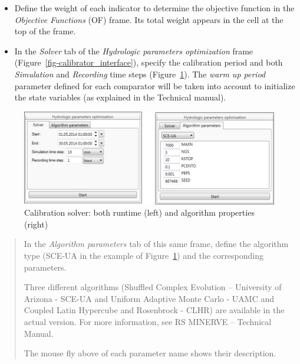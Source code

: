 \documentclass[
  letterpaper,
  DIV=11,
  numbers=noendperiod]{scrreprt}
\begin{document}
\begin{itemize}
\item
  {Define the weight of each indicator to determine the objective
  function in the \emph{Objective Functions} (OF) frame.} Its total
  weight appears in the cell at the top of the frame.
\item
  {In the \emph{Solver} tab of the \emph{Hydrologic parameters
  optimization} frame (Figure~\ref{fig-calibrator_interface}), specify
  the calibration period and both \emph{Simulation} and \emph{Recording}
  time steps (Figure~\ref{fig-calibrator_solver_runtime_algorithms}).
  The \emph{warm up period} parameter defined for each comparator will
  be taken into account to initialize the state variables (as explained
  in the Technical manual).}
\end{itemize}

\begin{figure}

{\centering \includegraphics{./figures/fig-calibrator_solver_runtime_algorithms.png}

}

\caption{\label{fig-calibrator_solver_runtime_algorithms}Calibration
solver: both runtime (left) and algorithm properties (right)}

\end{figure}

\begin{quote}
{In the \emph{Algorithm parameters} tab of this same frame, define the
algorithm type (SCE-UA in the example of
Figure~\ref{fig-calibrator_solver_runtime_algorithms}) and the
corresponding parameters.}

Three different algorithms (Shuffled Complex Evolution -- University of
Arizona - SCE-UA and Uniform Adaptive Monte Carlo - UAMC and Coupled
Latin Hypercube and Rosenbrock - CLHR) are available in the actual
version. For more information, see RS MINERVE -- Technical Manual.

The mouse fly above of each parameter name shows their description.
\end{quote}
\end{document}
